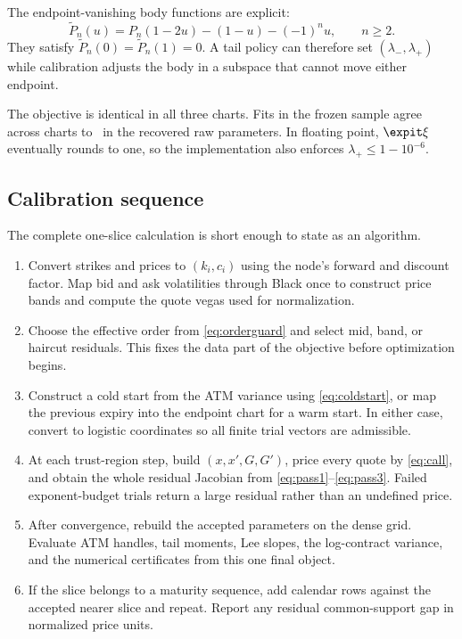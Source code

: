 The endpoint-vanishing body functions are explicit:
\begin{equation}
\widetilde P_n(u)=P_n(1-2u)-(1-u)-(-1)^nu,\qquad n\ge2.
\label{eq:endpointbasis}
\end{equation}
They satisfy $\widetilde P_n(0)=\widetilde P_n(1)=0$.  A tail policy can
therefore set $(\lambda_-,\lambda_+)$ while calibration adjusts the body in a
subspace that cannot move either endpoint.

The objective is identical in all three charts.  Fits in the frozen sample
agree across charts to \MacChartEquivParamAgree\ in the recovered raw
parameters.  In floating point, $\expit\xi$ eventually rounds to one, so the
implementation also enforces $\lambda_+\le1-10^{-6}$.

\subsection{Calibration sequence}

The complete one-slice calculation is short enough to state as an algorithm.

\begin{enumerate}
\item Convert strikes and prices to $(k_i,c_i)$ using the node's forward and
discount factor.  Map bid and ask volatilities through Black once to construct
price bands and compute the quote vegas used for normalization.
\item Choose the effective order from \eqref{eq:orderguard} and select mid,
band, or haircut residuals.  This fixes the data part of the objective before
optimization begins.
\item Construct a cold start from the ATM variance using
\eqref{eq:coldstart}, or map the previous expiry into the endpoint chart for a
warm start.  In either case, convert to logistic coordinates so all finite
trial vectors are admissible.
\item At each trust-region step, build $(x,x',G,G')$, price every quote by
\eqref{eq:call}, and obtain the whole residual Jacobian from
\eqref{eq:pass1}--\eqref{eq:pass3}.  Failed exponent-budget trials return a
large residual rather than an undefined price.
\item After convergence, rebuild the accepted parameters on the dense grid.
Evaluate ATM handles, tail moments, Lee slopes, the log-contract variance, and
the numerical certificates from this one final object.
\item If the slice belongs to a maturity sequence, add calendar rows against
the accepted nearer slice and repeat.  Report any residual common-support
gap in normalized price units.
\end{enumerate}

